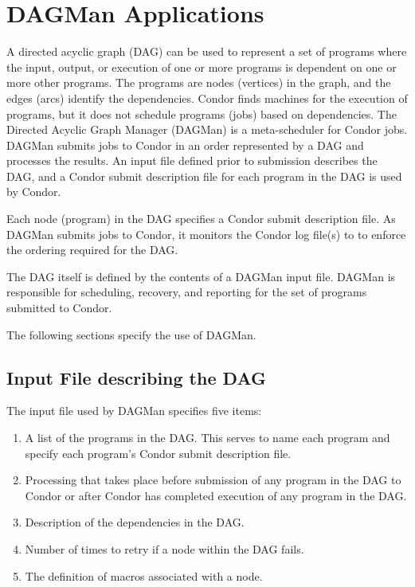 \section{\label{sec:DAGMan}DAGMan Applications}

A directed acyclic graph (DAG) can be used to represent a set of programs
where the input, output, or execution of one or more programs
is dependent on one or more other programs.
The programs are nodes (vertices) in the graph,
and the edges (arcs) identify the dependencies.
Condor finds machines for the execution of programs, but it
does not schedule programs (jobs) based on dependencies.
The Directed Acyclic Graph Manager (DAGMan) is a meta-scheduler for Condor
jobs. 
DAGMan submits jobs to Condor in an order represented by
a DAG and processes the results.
An input file defined prior to submission describes the DAG, and
a Condor submit description file for each program in the DAG
is used by Condor.

Each node (program) in the DAG specifies a Condor submit description file.
As DAGMan submits jobs to Condor, it monitors the Condor log file(s) to 
to enforce the ordering required for the DAG.

The DAG itself is defined by the contents of a DAGMan input file.
DAGMan is responsible for scheduling, recovery, and reporting
for the set of programs submitted to Condor.

The following sections specify the use of DAGMan.

\subsection{Input File describing the DAG}

The input file used by DAGMan specifies five items:
\begin{enumerate}
\item
A list of the programs in the DAG. This serves to name each program
and specify each program's Condor submit description file.
\item
Processing that takes place before submission of
any program in the DAG to Condor or after Condor has completed execution
of any program in the DAG.
\item
Description of the dependencies in the DAG.
\item
Number of times to retry if a node within the DAG fails.
\item
The definition of macros associated with a node.
\end{enumerate}

